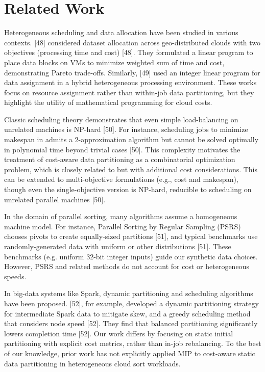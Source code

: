 \documentclass[]{interact}
\theoremstyle{plain}
\theoremstyle{definition}
\theoremstyle{remark}
\begin{document}
\section{Related Work}
\label{sec:related_work}
Heterogeneous scheduling and data allocation have been studied in various contexts. [48] considered dataset allocation across geo-distributed clouds with two objectives (processing time and cost) [48]. They formulated a linear program to place data blocks on VMs to minimize weighted sum of time and cost, demonstrating Pareto trade-offs. Similarly, [49] used an integer linear program for data assignment in a hybrid heterogeneous processing environment. These works focus on resource assignment rather than within-job data partitioning, but they highlight the utility of mathematical programming for cloud costs.

Classic scheduling theory demonstrates that even simple load-balancing on unrelated machines is NP-hard [50]. For instance, scheduling jobs to minimize makespan in  admits a 2-approximation algorithm but cannot be solved optimally in polynomial time beyond trivial cases [50]. This complexity motivates the treatment of cost-aware data partitioning as a combinatorial optimization problem, which is closely related to  but with additional cost considerations. This can be extended to multi-objective formulations (e.g., cost and makespan), though even the single-objective version is NP-hard, reducible to scheduling on unrelated parallel machines [50].

In the domain of parallel sorting, many algorithms assume a homogeneous machine model. For instance, Parallel Sorting by Regular Sampling (PSRS) chooses pivots to create equally-sized partitions [51], and typical benchmarks use randomly-generated data with uniform or other distributions [51]. These benchmarks (e.g. uniform 32-bit integer inputs) guide our synthetic data choices. However, PSRS and related methods do not account for cost or heterogeneous speeds.

In big-data systems like Spark, dynamic partitioning and scheduling algorithms have been proposed. [52], for example, developed a dynamic partitioning strategy for intermediate Spark data to mitigate skew, and a greedy scheduling method that considers node speed [52]. They find that balanced partitioning significantly lowers completion time [52]. Our work differs by focusing on static initial partitioning with explicit cost metrics, rather than in-job rebalancing. To the best of our knowledge, prior work has not explicitly applied MIP to cost-aware static data partitioning in heterogeneous cloud sort workloads.
\end{document}
